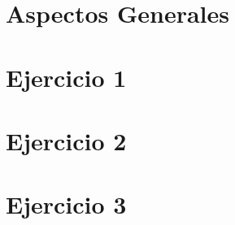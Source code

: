 \documentclass[12pt]{extarticle}
\numberwithin{equation}{section}
\begin{document}



\section{Aspectos Generales}



\section{Ejercicio 1}



\section{Ejercicio 2}



\section{Ejercicio 3}


\end{document}
